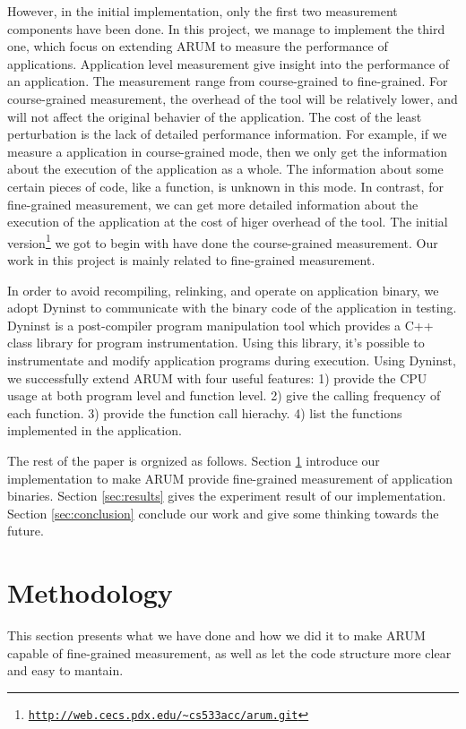 \documentclass[11pt,letterpaper,oneside]{article}
\begin{document}
However, in the initial implementation, only the first two measurement components have been done. In this project, we manage to implement the third one, which focus on extending ARUM to measure the performance of applications. Application level measurement give insight into the performance of an application. The measurement range from course-grained to fine-grained. For course-grained measurement, the overhead of the tool will be relatively lower, and will not affect the original behavier of the application. The cost of the least perturbation is the lack of detailed performance information. For example, if we measure a application in course-grained mode, then we only get the information about the execution of the application as a whole. The information about some certain pieces of code, like a function, is unknown in this mode. In contrast, for fine-grained measurement, we can get more detailed information about the execution of the application at the cost of higer overhead of the tool. The initial version\footnote{\texttt{\url{http://web.cecs.pdx.edu/~cs533acc/arum.git}}} we got to begin with have done the course-grained measurement. Our work in this project is mainly related to fine-grained measurement.

In order to avoid recompiling, relinking, and operate on application binary, we adopt Dyninst \cite{bib:dyninstweb} to communicate with the binary code of the application in testing. Dyninst is \cite{bib:anapi} a post-compiler program manipulation tool which provides a C++ class library for program instrumentation. Using this library, it's possible to instrumentate and modify application programs during execution. Using Dyninst, we successfully extend ARUM with four useful features: 1) provide the CPU usage at both program level and function level. 2) give the calling frequency of each function. 3) provide the function call hierachy. 4) list the functions implemented in the application.

The rest of the paper is orgnized as follows. Section \ref{sec:methodology} introduce our implementation to make ARUM provide fine-grained measurement of application binaries. Section \ref{sec:results} gives the experiment result of our implementation. Section \ref{sec:conclusion} conclude our work and give some thinking towards the future.

\section{Methodology}
\label{sec:methodology}
This section presents what we have done and how we did it to make ARUM capable of fine-grained measurement, as well as let the code structure more clear and easy to mantain.
\end{document}
